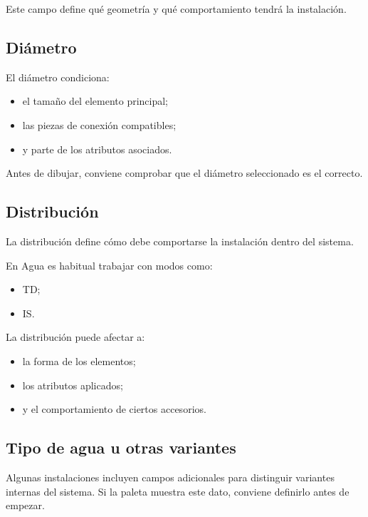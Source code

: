 Este campo define qué geometría y qué comportamiento tendrá la instalación.


\subsection{Diámetro}

El diámetro condiciona:

\begin{itemize}
\item el tamaño del elemento principal;
\item las piezas de conexión compatibles;
\item y parte de los atributos asociados.
\end{itemize}

Antes de dibujar, conviene comprobar que el diámetro seleccionado es el correcto.

\subsection{Distribución}

La distribución define cómo debe comportarse la instalación dentro del sistema.

En Agua es habitual trabajar con modos como:

\begin{itemize}
\item TD;
\item IS.
\end{itemize}

La distribución puede afectar a:

\begin{itemize}
\item la forma de los elementos;
\item los atributos aplicados;
\item y el comportamiento de ciertos accesorios.
\end{itemize}

\subsection{Tipo de agua u otras variantes}

Algunas instalaciones incluyen campos adicionales para distinguir variantes internas del sistema. Si la paleta muestra este dato, conviene definirlo antes de empezar.


